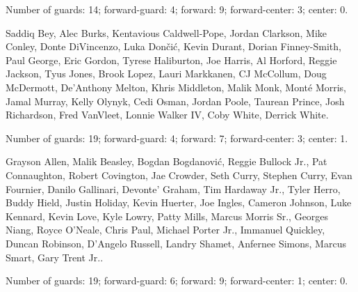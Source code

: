 \begin{description}
	      Number of guards: 14; forward-guard: 4; forward: 9; forward-center: 3; center: 0.

	\item[Cluster 4] Saddiq Bey, Alec Burks, Kentavious Caldwell-Pope, Jordan Clarkson, Mike Conley, Donte DiVincenzo, Luka Dončić, Kevin Durant, Dorian Finney-Smith, Paul George, Eric Gordon, Tyrese Haliburton, Joe Harris, Al Horford, Reggie Jackson, Tyus Jones, Brook Lopez, Lauri Markkanen, CJ McCollum, Doug McDermott, De'Anthony Melton, Khris Middleton, Malik Monk, Monté Morris, Jamal Murray, Kelly Olynyk, Cedi Osman, Jordan Poole, Taurean Prince, Josh Richardson, Fred VanVleet, Lonnie Walker IV, Coby White, Derrick White.

	      Number of guards: 19; forward-guard: 4; forward: 7; forward-center: 3; center: 1.

	\item[Cluster 5] Grayson Allen, Malik Beasley, Bogdan Bogdanović, Reggie Bullock Jr., Pat Connaughton, Robert Covington, Jae Crowder, Seth Curry, Stephen Curry, Evan Fournier, Danilo Gallinari, Devonte' Graham, Tim Hardaway Jr., Tyler Herro, Buddy Hield, Justin Holiday, Kevin Huerter, Joe Ingles, Cameron Johnson, Luke Kennard, Kevin Love, Kyle Lowry, Patty Mills, Marcus Morris Sr., Georges Niang, Royce O'Neale, Chris Paul, Michael Porter Jr., Immanuel Quickley, Duncan Robinson, D'Angelo Russell, Landry Shamet, Anfernee Simons, Marcus Smart, Gary Trent Jr..

	      Number of guards: 19; forward-guard: 6; forward: 9; forward-center: 1; center: 0.

\end{description}


